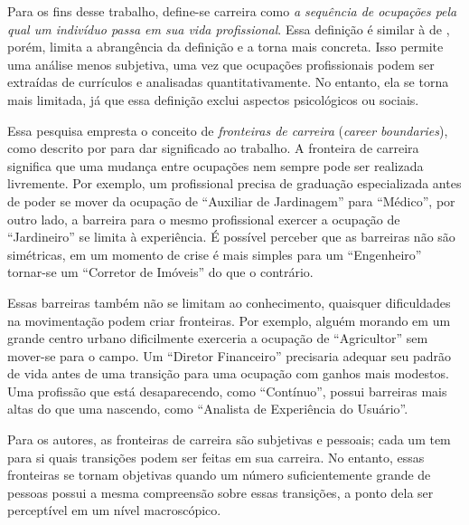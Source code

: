 \documentclass[
  article,
  11pt,
  a4paper,
  english,
  brazil,
  sumario=tradicional]{abntex2}
\begin{document}
Para os fins desse trabalho, define-se carreira como \textit{a sequência de ocupações pela qual um indivíduo passa em sua vida profissional}. Essa definição é similar à de , porém, limita a abrangência da definição e a torna mais concreta. Isso permite uma análise menos subjetiva, uma vez que ocupações profissionais podem ser extraídas de currículos e analisadas quantitativamente. No entanto, ela se torna mais limitada, já que essa definição exclui aspectos psicológicos ou sociais.

Essa pesquisa empresta o conceito de \textit{fronteiras de carreira} (\textit{career boundaries}), como descrito por  para dar significado ao trabalho. A fronteira de carreira significa que uma mudança entre ocupações nem sempre pode ser realizada livremente. Por exemplo, um profissional precisa de graduação especializada antes de poder se mover da ocupação de \enquote{Auxiliar de Jardinagem} para \enquote{Médico}, por outro lado, a barreira para o mesmo profissional exercer a ocupação de \enquote{Jardineiro} se limita à experiência. É possível perceber que as barreiras não são simétricas, em um momento de crise é mais simples para um \enquote{Engenheiro} tornar-se um \enquote{Corretor de Imóveis} do que o contrário.

Essas barreiras também não se limitam ao conhecimento, quaisquer dificuldades na movimentação podem criar fronteiras. Por exemplo, alguém morando em um grande centro urbano dificilmente exerceria a ocupação de \enquote{Agricultor} sem mover-se para o campo. Um \enquote{Diretor Financeiro} precisaria adequar seu padrão de vida antes de uma transição para uma ocupação com ganhos mais modestos. Uma profissão que está desaparecendo, como \enquote{Contínuo}, possui barreiras mais altas do que uma nascendo, como \enquote{Analista de Experiência do Usuário}.

Para os autores, as fronteiras de carreira são subjetivas e pessoais; cada um tem para si quais transições podem ser feitas em sua carreira. No entanto, essas fronteiras se tornam objetivas quando um número suficientemente grande de pessoas possui a mesma compreensão sobre essas transições, a ponto dela ser perceptível em um nível macroscópico.
\end{document}

